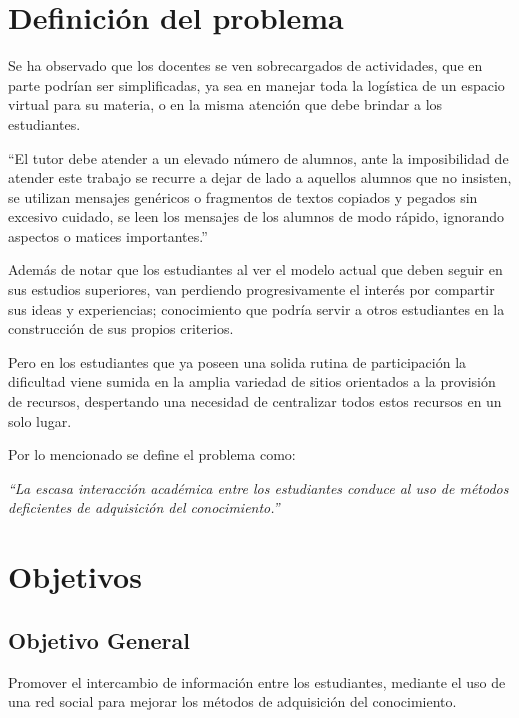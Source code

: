 \documentclass[letterpaper,11pt]{article}
\begin{document}
\section{Definición del problema}
Se ha observado que los docentes se ven sobrecargados de actividades, que en parte
podrían ser simplificadas, ya sea en manejar toda la logística de un espacio virtual para su
materia, o en la misma atención que debe brindar a los estudiantes.

“El tutor debe atender a un elevado número de alumnos, ante la imposibilidad de atender
este trabajo se recurre a dejar de lado a aquellos alumnos que no insisten, se utilizan
mensajes genéricos o fragmentos de textos copiados y pegados sin excesivo cuidado, se
leen los mensajes de los alumnos de modo rápido, ignorando aspectos o matices
importantes.” \cite{Bartolome}

Además de notar que los estudiantes al ver el modelo actual que deben seguir en sus
estudios superiores, van perdiendo progresivamente el interés por compartir sus ideas y
experiencias; conocimiento que podría servir a otros estudiantes en la construcción de sus
propios criterios.

Pero en los estudiantes que ya poseen una solida rutina de participación la dificultad viene
sumida en la amplia variedad de sitios orientados a la provisión de recursos, despertando
una necesidad de centralizar todos estos recursos en un solo lugar.

Por lo mencionado se define el problema como:

\emph{“La escasa interacción académica entre los estudiantes conduce al uso de métodos
deficientes de adquisición del conocimiento.”}

\section{Objetivos}

\subsection{Objetivo General}
Promover el intercambio de información entre los estudiantes, mediante el uso de una red
social para mejorar los métodos de adquisición del conocimiento.
\end{document}
